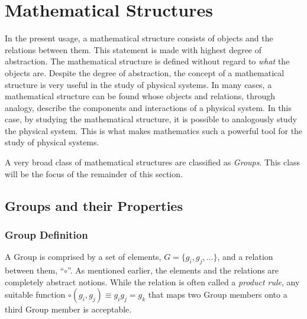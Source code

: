 \section{Mathematical Structures}

In the present usage, a mathematical structure consists of objects and the relations between them.
This statement is made with highest degree of abstraction. The mathematical structure is defined without regard to \emph{what} the objects are.
Despite the degree of abstraction, the concept of a mathematical structure is very useful in the study of physical systems.
In many cases, a mathematical structure can be found whose objects and relations, through analogy, describe the components and interactions of a physical system.
In this case, by studying the mathematical structure, it is possible to analogously study the physical system.
This is what makes mathematics such a powerful tool for the study of physical systems.

A very broad class of mathematical structures are classified as \emph{Groups}.
This class will be the focus of the remainder of this section.

\subsection{Groups and their Properties}

\subsubsection{Group Definition}
A Group is comprised by a set of elements, $G=\{g_i,g_j,...\}$, and a relation between them, ``$\circ$''. 
As mentioned earlier, the elements and the relations are completely abstract notions.
While the relation is often called a \emph{product rule}, any suitable function $\circ(g_i,g_j)\equiv g_ig_j=g_k$ that maps two Group members onto a third Group member is acceptable.


